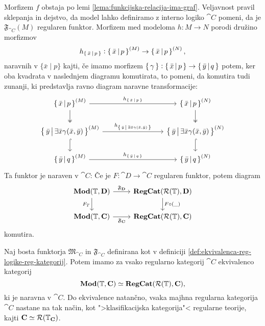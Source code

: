 \documentclass[../kategoricna_logika.tex]{subfiles}
\begin{document}
Morfizem $f$ obstaja po lemi \ref{lema:funkcijska-relacija-ima-graf}.
Veljavnost pravil sklepanja in dejstvo, da model lahko definiramo z
interno logiko $\cat{C}$ pomeni, da je $\mathfrak{F}_{\cat{C}}(M)$
regularen funktor.  Morfizem med modeloma $h : M \to N$ porodi družino
morfizmov
$$h_{\left\lbrace\,\bar{x}\,\middle|\, p\,\right\rbrace} : \left\lbrace\,\bar{x}\,\middle|\, p\,\right\rbrace^{(M)} \to \left\lbrace\,\bar{x}\,\middle|\, p\,\right\rbrace^{(N)},$$
naravnih v $\{\bar{x} \mid p\}$ kajti, če imamo morfizem
$\left\lbrace\,\gamma\,\right\rbrace : \left\lbrace\,\bar{x}\,\middle|\, p\,\right\rbrace \to
\left\lbrace\,\bar{y}\,\middle|\, q\,\right\rbrace$ potem, ker oba kvadrata v naslednjem
diagramu komutirata, to pomeni, da komutira tudi zunanji, ki
predstavlja ravno diagram naravne transformacije:
\begin{equation*}
  \begin{tikzcd}[column sep=3cm]
    \set{\bar{x}\,\middle|\, p}^{(M)} \ar[d, two heads] \ar[r, "h_{\set{\bar{x}\,\middle|\, p}}"] & \set{\bar{x}\,\middle|\, p}^{(N)} \ar[d, two heads] \\
    \set{\bar{y}\,\middle|\, \exists \bar{x} \gamma(\bar{x}, \bar{y})}^{(M)}  \ar[d, hook] \ar[r, "h_{\set{\bar{y}\,\middle|\, \exists \bar{x} \gamma(\bar{x}, \bar{y})}}"] & \set{\bar{y}\,\middle|\, \exists \bar{x} \gamma(\bar{x}, \bar{y})}^{(N)} \ar[d, hook] \\
    \set{\bar{y}\,\middle|\, q}^{(M)} \ar[r,
    "h_{\set{\bar{y}\,\middle|\, q}}"] & \set{\bar{y}\,\middle|\,
      q}^{(N)}
  \end{tikzcd}
\end{equation*}
Ta funktor je naraven v $\cat{C}$: Če je $F : \cat{D} \to \cat{C}$
regularen funktor, potem diagram
\begin{equation}\label{diag:naravnost-F}
  \begin{tikzcd}
    \Mod(\T, \cat{D}) \ar[d, "F_T"'] \ar[r, "\mathfrak{F}_{\cat{D}}"] & \cat{RegCat}(\mathcal{R}(\T), \cat{D}) \ar[d, "F \circ (\_)"] \\
    \Mod(\T, \cat{C}) \ar[r, "\mathfrak{F}_{\cat{C}}"'] &
    \cat{RegCat}(\mathcal{R}(\T), \cat{C})
  \end{tikzcd}
\end{equation}
komutira.
\begin{izrek}
  Naj bosta funktorja $\mathfrak{M}_{\cat{C}}$ in $\mathfrak{F}_{\cat{C}}$ definirana kot
  v definiciji \ref{def:ekvivalenca-reg-logike-reg-kategorij}. Potem imamo za vsako
  regularno kategorij $\cat{C}$ ekvivalenco kategorij
  $$\mathbf{Mod}(\mathbb{T}, {\operatorname{\mathbf{C}}}) \simeq {\operatorname{\mathbf{RegCat}}}(\mathcal{R}(\mathbb{T}), {\operatorname{\mathbf{C}}}),$$
  ki je naravna v $\cat{C}$. Do ekvivalence natančno, vsaka majhna
  regularna kategorija $\cat{C}$ nastane na tak način, kot
  ">klasifikacijska kategorija"< regularne teorije, kajti
  ${\operatorname{\mathbf{C}}} \simeq \mathcal{R}(\mathbb{T}_{{\operatorname{\mathbf{C}}}})$.
\end{izrek}
\end{document}
